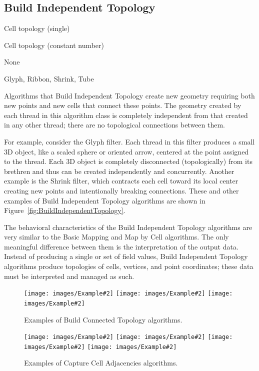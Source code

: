 \documentclass{sig-alternate}
\newcommand{\algclass}[1]{\textsf{#1}}
\newcommand{\alg}[1]{#1}
\newcommand{\algorithmclasssection}[1]{\subsection*{#1}}
\newcommand{\algorithmclass}[5]{
  \algorithmclasssection{#1} %
  \begin{description}[leftmargin=9em,style=nextline,noitemsep]
    \raggedright
  \item[Input] #2
  \item[Output] #3
  \item[Interdependence] #4
  \item[Algorithms] #5
  \end{description}
}
\newcommand{\exampleimage}[2][.24]{\texttt{[image: images/Example\#2]}}
\begin{document}
\algorithmclass{Build Independent Topology}
               {Cell topology (single)} %
               {Cell topology (constant number)} %
               {None} %
               {
                 Glyph,
                 Ribbon,
                 Shrink,
                 Tube
               }

\noindent
Algorithms that \algclass{Build Independent Topology} create new geometry
requiring both new points and new cells that connect these points. The
geometry created by each thread in this algorithm class is completely
independent from that created in any other thread; there are no topological
connections between them.

For example, consider the \alg{Glyph} filter. Each thread in this filter
produces a small 3D object, like a scaled sphere or oriented arrow,
centered at the point assigned to the thread. Each 3D object is completely
disconnected (topologically) from its brethren and thus can be created
independently and concurrently. Another example is the \alg{Shrink} filter,
which contracts each cell toward its local center creating new points and
intentionally breaking connections. These and other examples of
\algclass{Build Independent Topology} algorithms are shown in
Figure~\ref{fig:BuildIndependentTopology}.

The behavioral characteristics of the \algclass{Build Independent Topology}
algorithms are very similar to the \algclass{Basic Mapping} and
\algclass{Map by Cell} algorithms. The only meaningful difference between
them is the interpretation of the output data. Instead of producing a
single or set of field values, \algclass{Build Independent Topology}
algorithms produce topologies of cells, vertices, and point coordinates;
these data must be interpreted and managed as such.


\begin{figure}
  \centering
  \exampleimage[.31]{Clip}
  \exampleimage[.31]{Contour}
  \exampleimage[.31]{Slice}
  \caption{Examples of \algclass{Build Connected Topology} algorithms.}
  \label{fig:BuildConnectedTopology}
\end{figure}

\begin{figure}
  \centering
  \exampleimage{ExtractEdges}
  \exampleimage{FeatureEdges}
  \exampleimage{Gradient}
  \exampleimage{Normals}
  \caption{Examples of \algclass{Capture Cell Adjacencies} algorithms.}
  \label{fig:CaptureCellAdjacencies}
\end{figure}
\end{document}
